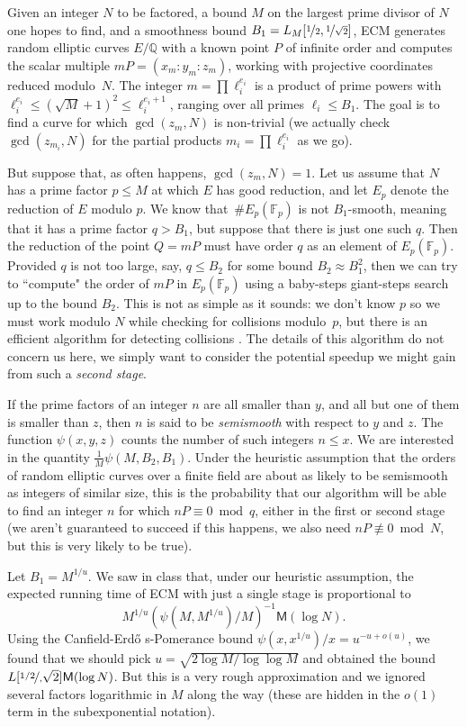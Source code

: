 \documentclass[11pt]{article}
\newcommand{\Fp}{\mathbb{F}_p}
\newcommand{\Q}{\mathbb{Q}}
\newcommand{\M}{\textsf{M}}
\theoremstyle{definition}
\begin{document}
Given an integer $N$ to be factored, a bound $M$ on the largest prime divisor of $N$ one hopes to find, and a smoothness bound $B_1=L_M[\nicefrac{1}{2},\nicefrac{1}{\sqrt{2}}]$, ECM generates random elliptic curves $E/\Q$ with a known point $P$ of infinite order and computes the scalar multiple $mP=(x_m:y_m:z_m)$, working with projective coordinates reduced modulo~$N$.
The integer $m=\prod \ell_i^{e_i}$ is a product of prime powers with $\ell_i^{e_i} \le (\sqrt{M}+1)^2\le \ell_i^{e_i+1}$, ranging over all primes $\ell_i\le B_1$. 
The goal is to find a curve for which $\gcd(z_m,N)$ is non-trivial (we actually check $\gcd(z_{m_i},N)$ for the partial products $m_i=\prod \ell_i^{e_i}$ as we go).

But suppose that, as often happens, $\gcd(z_m,N)=1$.
Let us assume that $N$ has a prime factor $p\le M$ at which $E$ has good reduction, and let $E_p$ denote the reduction of $E$ modulo $p$.
We know that~$\#E_p(\Fp)$ is not $B_1$-smooth, meaning that it has a prime factor $q>B_1$, but suppose that there is just one such $q$.
Then the reduction of the point $Q=mP$ must have order $q$ as an element of $E_p(\Fp)$.
Provided $q$ is not too large, say, $q\le B_2$ for some bound $B_2\approx B_1^2$, then we can try to ``compute" the order of $mP$ in $E_p(\Fp)$ using a baby-steps giant-steps search up to the bound $B_2$.
This is not as simple as it sounds: we don't know $p$ so we must work modulo $N$ while checking for collisions modulo~$p$,
but there is an efficient algorithm for detecting collisions \cite[\S 3]{ZD}.
The details of this algorithm do not concern us here,  we simply want to consider the potential speedup we might gain from such a \emph{second stage}.

If the prime factors of an integer $n$ are all smaller than $y$, and all but one of them is smaller than $z$, then $n$ is said to be \emph{semismooth} with respect to $y$ and $z$.  The function $\psi(x,y,z)$ counts the number of such integers $n\le x$.
We are interested in the quantity $\frac{1}{M}\psi(M,B_2,B_1)$.
Under the heuristic assumption that the orders of random elliptic curves over a finite field are about as likely to be semismooth as integers of similar size, this is the probability that our algorithm will be able to find an integer $n$ for which $nP\equiv 0\bmod q$, either in the first or second stage (we aren't guaranteed to succeed if this happens, we also need $nP\not\equiv 0\bmod N$, but this is very likely to be true).

Let $B_1=M^{1/u}$.  We saw in class that, under our heuristic assumption, the expected running time of ECM with just a single stage is proportional to
\begin{equation}\label{eq:ecmcost}
M^{1/u}(\psi(M,M^{1/u})/M)^{-1}\M(\log N).
\end{equation}
Using the Canfield-Erd\H o s-Pomerance bound $\psi(x,x^{1/u})/x=u^{-u+o(u)}$, we found that we should pick $u=\sqrt{2\log M/\log\log M}$
and obtained the bound $L[\nicefrac{1/2},\sqrt{2}]\M(\log N)$.
But this is a very rough approximation and we ignored several factors logarithmic in $M$ along the way (these are hidden in the $o(1)$ term in the subexponential notation).
\end{document}
